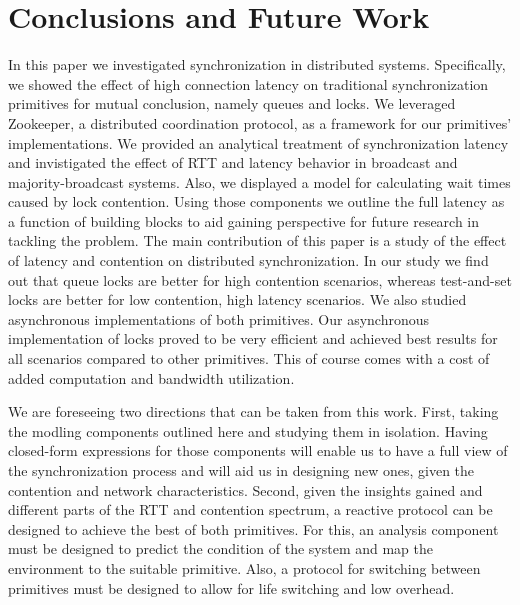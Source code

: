 \section{Conclusions and Future Work}\label{sec:conclusions}
In this paper we investigated synchronization in distributed systems. Specifically, we showed the effect of high connection latency on traditional synchronization primitives for mutual conclusion, namely queues and locks. We leveraged Zookeeper, a distributed coordination protocol, as a framework for our primitives' implementations. We provided an analytical treatment of synchronization latency and invistigated the effect of RTT and latency behavior in broadcast and majority-broadcast systems. Also, we displayed a model for calculating wait times caused by lock contention. Using those components we outline the full latency as a function of building blocks to aid gaining perspective for future research in tackling the problem. The main contribution of this paper is a study of the effect of latency and contention on distributed synchronization. In our study we find out that queue locks are better for high contention scenarios, whereas test-and-set locks are better for low contention, high latency scenarios. We also studied asynchronous implementations of both primitives. Our asynchronous implementation of locks proved to be very efficient and achieved best results for all scenarios compared to other primitives. This of course comes with a cost of added computation and bandwidth utilization.

We are foreseeing two directions that can be taken from this work. First, taking the modling components outlined here and studying them in isolation. Having closed-form expressions for those components will enable us to have a full view of the synchronization process and will aid us in designing new ones, given the contention and network characteristics. Second, given the insights gained and different parts of the RTT and contention spectrum, a reactive protocol can be designed to achieve the best of both primitives. For this, an analysis component must be designed to predict the condition of the system and map the environment to the suitable primitive. Also, a protocol for switching between primitives must be designed to allow for life switching and low overhead.
